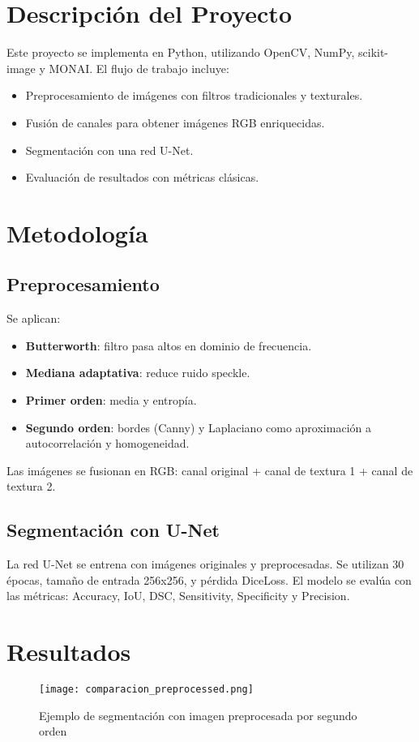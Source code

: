 \documentclass[12pt]{article}
\begin{document}
\section{Descripción del Proyecto}
Este proyecto se implementa en Python, utilizando OpenCV, NumPy, scikit-image y MONAI. El flujo de trabajo incluye:
\begin{itemize}
    \item Preprocesamiento de imágenes con filtros tradicionales y texturales.
    \item Fusión de canales para obtener imágenes RGB enriquecidas.
    \item Segmentación con una red U-Net.
    \item Evaluación de resultados con métricas clásicas.
\end{itemize}

\section{Metodología}
\subsection{Preprocesamiento}
Se aplican:
\begin{itemize}
    \item \textbf{Butterworth}: filtro pasa altos en dominio de frecuencia.
    \item \textbf{Mediana adaptativa}: reduce ruido speckle.
    \item \textbf{Primer orden}: media y entropía.
    \item \textbf{Segundo orden}: bordes (Canny) y Laplaciano como aproximación a autocorrelación y homogeneidad.
\end{itemize}

Las imágenes se fusionan en RGB: canal original + canal de textura 1 + canal de textura 2.

\subsection{Segmentación con U-Net}
La red U-Net se entrena con imágenes originales y preprocesadas. Se utilizan 30 épocas, tamaño de entrada 256x256, y pérdida DiceLoss. El modelo se evalúa con las métricas: Accuracy, IoU, DSC, Sensitivity, Specificity y Precision.

\section{Resultados}
\begin{figure}[H]
\centering
\texttt{[image: comparacion\_preprocessed.png]}
\caption{Ejemplo de segmentación con imagen preprocesada por segundo orden}
\end{figure}
\end{document}
